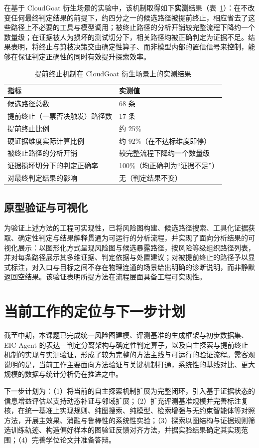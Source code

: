 \documentclass[a4paper,12pt]{ctexart}
\begin{document}
在基于 CloudGoat 衍生场景的实验中，该机制取得如下\textbf{实测}结果（表~\ref{tab:et}）：在不改变任何最终判定结果的前提下，约四分之一的候选路径被提前终止，相应省去了这些路径上不必要的工具与模型调用；被终止路径的分析开销较完整流程下降约一个数量级；在证据被人为损坏的测试切分下，相关路径均被正确判定为证据不足。结果表明，将终止与剪枝决策交由确定性算子、而非模型内部的置信信号来控制，能够在保证判定正确性的同时有效提升探索效率。

\begin{table}[h]
\centering
\caption{提前终止机制在 CloudGoat 衍生场景上的实测结果}
\label{tab:et}
\begin{tabular}{ll}
\toprule
\textbf{指标} & \textbf{实测值} \\
\midrule
候选路径总数 & 68 条 \\
提前终止（一票否决触发）路径数 & 17 条 \\
提前终止比例 & 约 25\% \\
硬证据维度实际计算比例 & 约 92\%（在不达标维度即停） \\
被终止路径的分析开销 & 较完整流程下降约一个数量级 \\
证据损坏切分下的判定正确率 & 100\%（均正确判为“证据不足”） \\
对最终判定结果的影响 & 无（判定结果不变） \\
\bottomrule
\end{tabular}
\end{table}

\subsection{原型验证与可视化}

为验证上述方法的工程可实现性，已将风险图构建、候选路径搜索、工具化证据获取、确定性判定与结果解释贯通为可运行的分析流程，并实现了面向分析结果的可视化展示：以图形化方式呈现风险图与候选暴露路径，按风险等级组织路径列表，并对每条路径展示其多维证据、判定依据与处置建议；对被提前终止的路径予以显式标注，对入口与目标之间不存在物理连通的场景给出明确的诊断说明，而非静默返回空结果。该验证表明所提方法在流程层面具备工程可实现性。

\section{当前工作的定位与下一步计划}

截至中期，本课题已完成统一风险图建模、评测基准的生成框架与初步数据集、EIC-Agent 的表达—判定分离架构与确定性判定算子，以及自主探索与提前终止机制的实现与实测验证，形成了较为完整的方法主线与可运行的验证流程。需客观说明的是，当前工作主要面向方法验证与关键机制打通，系统性的基线对比、更大规模的数据与统计分析仍在推进之中。

下一步计划为：（1）将当前的自主探索机制扩展为完整闭环，引入基于证据状态的信息增益评估以支持动态补证与邻域扩展；（2）扩充评测基准规模并完善标注复核，在统一基准上实现规则、纯图搜索、纯模型、检索增强与无约束智能体等对照方法，开展主效果、消融与鲁棒性的系统性实验；（3）探索以图结构与证据规则筛选训练轨迹、构造偏好样本的图验证反馈对齐方法，并据实验结果确定其实现范围；（4）完善学位论文并准备答辩。
\end{document}
